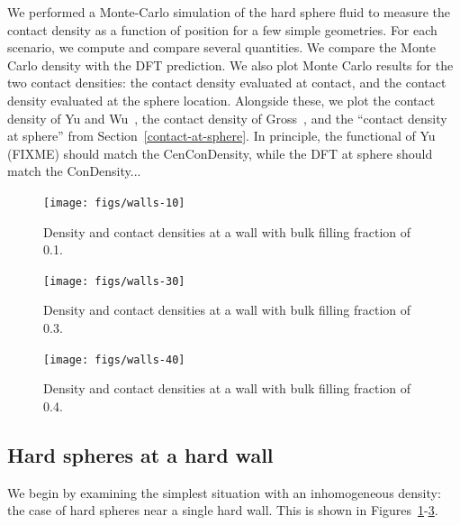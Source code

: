 \documentclass[letterpaper,twocolumn,amsmath,amssymb,jcp,10pt,aip]{revtex4-1}
\begin{document}
We performed a Monte-Carlo simulation of the hard sphere fluid to
measure the contact density as a function of position for a few simple
geometries.  For each scenario, we compute and compare several
quantities.  We compare the Monte Carlo density with the DFT
prediction.  We also plot Monte Carlo results for the two contact
densities: the contact density evaluated at contact, and the contact
density evaluated at the sphere location.  Alongside these, we plot
the contact density of Yu and
Wu~\cite{yu2002fmt-dft-inhomogeneous-associating}, the contact density
of Gross~\cite{gross2009density}, and the ``contact density at
sphere'' from Section~\ref{contact-at-sphere}.  In principle, the
functional of Yu (FIXME) should match the CenConDensity, while the DFT
at sphere should match the ConDensity...

\begin{figure}
  \texttt{[image: figs/walls-10]}
  \caption{Density and contact densities at a wall with bulk filling
    fraction of 0.1.}
  \label{fig:walls-10}
\end{figure}

\begin{figure}
  \texttt{[image: figs/walls-30]}
  \caption{Density and contact densities at a wall with bulk filling
    fraction of 0.3.}
  \label{fig:walls-30}
\end{figure}

\begin{figure}
  \texttt{[image: figs/walls-40]}
  \caption{Density and contact densities at a wall with bulk filling
    fraction of 0.4.}
  \label{fig:walls-40}
\end{figure}

\subsection{Hard spheres at a hard wall}

We begin by examining the simplest situation with an inhomogeneous
density:  the case of hard spheres near a single hard wall.  This is
shown in Figures~\ref{fig:walls-10}-\ref{fig:walls-40}.



\newcommand\sphereExplanation{ Blue curves describe the density of
  hard spheres.  Green curves describe the contact density averaged
  according to the point of contact.  Red curves describe the contact
  density as averaged according to the centers of the spheres that are
  touching.  In each case, solid lines correspond to the Monte Carlo
  simulation, and dashed lines of various sorts represent DFT model
  predictions.  }
\end{document}
